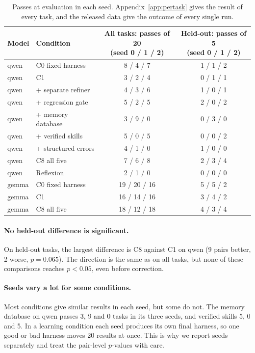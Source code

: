 \begin{table}[t]
\centering
\small
\begin{tabular}{llcc}
\toprule
Model & Condition & \makecell{All tasks: passes of 20\\(seed 0 / 1 / 2)} & \makecell{Held-out: passes of 5\\(seed 0 / 1 / 2)} \\
\midrule
qwen  & C0 fixed harness    & 8 / 4 / 7  & 1 / 1 / 2 \\
qwen  & C1                  & 3 / 2 / 4  & 0 / 1 / 1 \\
qwen  & + separate refiner  & 4 / 3 / 6  & 1 / 0 / 1 \\
qwen  & + regression gate   & 5 / 2 / 5  & 2 / 0 / 2 \\
qwen  & + memory database   & 3 / 9 / 0  & 0 / 3 / 0 \\
qwen  & + verified skills   & 5 / 0 / 5  & 0 / 0 / 2 \\
qwen  & + structured errors & 4 / 1 / 0  & 1 / 0 / 0 \\
qwen  & C8 all five         & 7 / 6 / 8  & 2 / 3 / 4 \\
qwen  & Reflexion           & 2 / 1 / 0  & 0 / 0 / 0 \\
\midrule
gemma & C0 fixed harness    & 19 / 20 / 16 & 5 / 5 / 2 \\
gemma & C1                  & 16 / 14 / 16 & 3 / 4 / 2 \\
gemma & C8 all five         & 18 / 12 / 18 & 4 / 3 / 4 \\
\bottomrule
\end{tabular}
\caption{Passes at evaluation in each seed. Appendix~\ref{app:pertask} gives the result of every
task, and the released data give the outcome of every single run.}
\label{tab:seeds}
\end{table}

\paragraph{No held-out difference is significant.}
On held-out tasks, the largest difference is C8 against C1 on qwen (9 pairs better, 2 worse,
$p = 0.065$). The direction is the same as on all tasks, but none of these comparisons reaches
$p < 0.05$, even before correction.

\paragraph{Seeds vary a lot for some conditions.}
Most conditions give similar results in each seed, but some do not. The memory database on qwen
passes 3, 9 and 0 tasks in its three seeds, and verified skills 5, 0 and 5. In a learning condition
each seed produces its own final harness, so one good or bad harness moves 20 results at once. This
is why we report seeds separately and treat the pair-level $p$-values with care.

